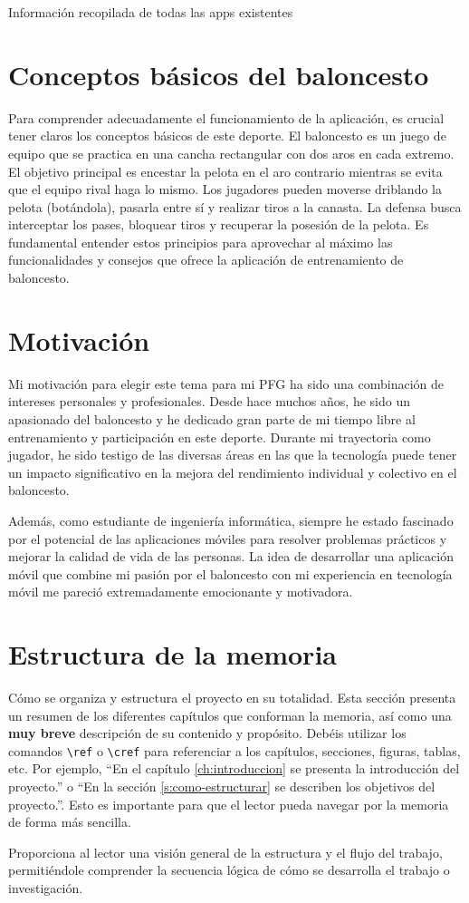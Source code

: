 Información recopilada de todas las apps existentes

\section{Conceptos básicos del baloncesto}

Para comprender adecuadamente el funcionamiento de la aplicación, es crucial tener claros los conceptos básicos de este deporte. El baloncesto es un juego de equipo que se practica en una cancha rectangular con dos aros en cada extremo. El objetivo principal es encestar la pelota en el aro contrario mientras se evita que el equipo rival haga lo mismo. Los jugadores pueden moverse driblando la pelota (botándola), pasarla entre sí y realizar tiros a la canasta. La defensa busca interceptar los pases, bloquear tiros y recuperar la posesión de la pelota. Es fundamental entender estos principios para aprovechar al máximo las funcionalidades y consejos que ofrece la aplicación de entrenamiento de baloncesto.

\section{Motivación}

Mi motivación para elegir este tema para mi PFG ha sido una combinación de intereses personales y profesionales. Desde hace muchos años, he sido un apasionado del baloncesto y he dedicado gran parte de mi tiempo libre al entrenamiento y participación en este deporte. Durante mi trayectoria como jugador, he sido testigo de las diversas áreas en las que la tecnología puede tener un impacto significativo en la mejora del rendimiento individual y colectivo en el baloncesto.

Además, como estudiante de ingeniería informática, siempre he estado fascinado por el potencial de las aplicaciones móviles para resolver problemas prácticos y mejorar la calidad de vida de las personas. La idea de desarrollar una aplicación móvil que combine mi pasión por el baloncesto con mi experiencia en tecnología móvil me pareció extremadamente emocionante y motivadora.

\section{Estructura de la memoria}

Cómo se organiza y estructura el proyecto en su totalidad. Esta sección presenta un resumen de los diferentes capítulos que conforman la memoria, así como una \textbf{muy breve} descripción de su contenido y propósito.
Debéis utilizar los comandos \texttt{\textbackslash ref} o \texttt{\textbackslash cref} para referenciar a los capítulos, secciones, figuras, tablas, etc.
Por ejemplo, \enquote{En el capítulo \ref{ch:introduccion} se presenta la introducción del proyecto.} o \enquote{En la sección \ref{s:como-estructurar} se describen los objetivos del proyecto.}. Esto es importante para que el lector pueda navegar por la memoria de forma más sencilla.

Proporciona al lector una visión general de la estructura y el flujo del trabajo, permitiéndole comprender la secuencia lógica de cómo se desarrolla el trabajo o investigación.